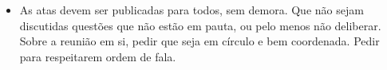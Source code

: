 \documentclass{ata-calico}
\begin{document}
\begin{itemize}
\item As atas devem ser publicadas para todos, sem demora. Que não sejam discutidas questões que não estão em pauta, ou pelo menos não deliberar. Sobre a reunião em si, pedir que seja em círculo e bem coordenada. Pedir para respeitarem ordem de fala.
\end{itemize}

\end{document}
